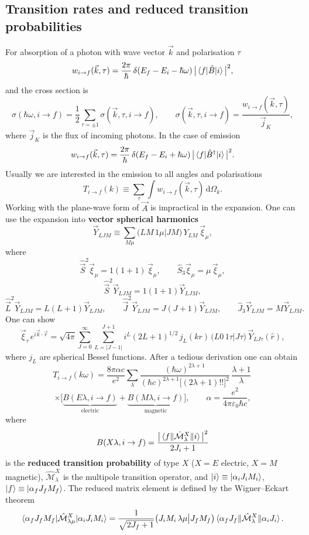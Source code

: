 \documentclass[11pt,a4paper]{article}
\newcommand{\op}[1]{\hat{#1}}
\newcommand{\ud}{\mathrm{d}}
\begin{document}
\subsection{Transition rates and reduced transition probabilities}
For absorption of a photon with wave vector $\vec k$ and polarisation $\tau$
\[
w_{i\to f}(\vec k,\tau)=\frac{2\pi}{\hbar}\,\delta(E_f-E_i-\hbar\omega)\,\big|\braket{f|\op B|i}\big|^2 ,
\]
and the cross section is
\[
\sigma(\hbar\omega,i\to f)=\frac12\sum_{\tau=\pm1}\sigma(\vec k,\tau,i\to f),
\qquad
\sigma(\vec k,\tau,i\to f)=\frac{w_{i\to f}(\vec k,\tau)}{\vec j_K},
\]
where $\vec j_K$ is the flux of incoming photons.
In the case of emission
\[
w_{i\to f}(\vec k,\tau)=\frac{2\pi}{\hbar}\,\delta(E_f-E_i+\hbar\omega)\,\big|\braket{f|\op B^\dagger|i}\big|^2 .
\]
Usually we are interested in the emission to all angles and polarisations
\[
T_{i\to f}(k)\equiv\sum_\tau\int w_{i\to f}(\vec k,\tau)\,\ud\Omega_k .
\]
Working with the plane-wave form of $\vec A$ is impractical in the expansion. One can use the expansion into \textbf{vector spherical harmonics}
\[
\vec Y_{LJM}\equiv\sum_{M\mu}\big(LM\,1\mu\big|JM\big)\,Y_{LM}\,\vec\xi_\mu ,
\]
where
\[
\op{\vec S}^2\vec\xi_\mu=1(1+1)\,\vec\xi_\mu,\qquad \op S_3\vec\xi_\mu=\mu\,\vec\xi_\mu,
\]
\[
\op{\vec S}^2\vec Y_{LJM}=1(1+1)\vec Y_{LJM},
\]
\[
\op{\vec L}^2\vec Y_{LJM}=L(L+1)\vec Y_{LJM},\qquad
\op{\vec J}^2\vec Y_{LJM}=J(J+1)\vec Y_{LJM},\qquad
\op J_3\vec Y_{LJM}=M\vec Y_{LJM}.
\]
One can show
\[
\vec\xi_\tau\,e^{i\vec k\cdot\vec r}=\sqrt{4\pi}\sum_{J=0}^\infty\sum_{L=|J-1|}^{J+1}i^L(2L+1)^{1/2}\,j_L(kr)\,\big(L0\,1\tau\big|J\tau\big)\,\vec Y_{LJ\tau}(\hat r),
\]
where $j_L$ are spherical Bessel functions. After a tedious derivation one can obtain
\[
T_{i\to f}(k\omega)=\frac{8\pi\alpha c}{e^2}\sum_\lambda\frac{(\hbar\omega)^{2\lambda+1}}{(\hbar c)^{2\lambda+1}\big[(2\lambda+1)!!\big]^2}\,\frac{\lambda+1}{\lambda}\,
\]
\[
\times\Big[\underbrace{B(E\lambda,i\to f)}_{\text{electric}}+\underbrace{B(M\lambda,i\to f)}_{\text{magnetic}}\Big],
\qquad \alpha=\frac{e^2}{4\pi\varepsilon_0\hbar c},
\]
where
\[
B(X\lambda,i\to f)=\frac{\big|\braket{f\|\op{\mathcal M}^X_\lambda\|i}\big|^2}{2J_i+1}
\]
is the \textbf{reduced transition probability} of type $X$ ($X=E$ electric, $X=M$ magnetic), $\op{\mathcal M}^X_\lambda$ is the multipole transition operator, and $\ket i\equiv\ket{\alpha_iJ_iM_i}$, $\ket f\equiv\ket{\alpha_fJ_fM_f}$. The reduced matrix element is defined by the Wigner--Eckart theorem
\[
\braket{\alpha_fJ_fM_f|\op{\mathcal M}^X_{\lambda\mu}|\alpha_iJ_iM_i}=\frac{1}{\sqrt{2J_f+1}}\big(J_iM_i\,\lambda\mu\big|J_fM_f\big)\braket{\alpha_fJ_f\|\op{\mathcal M}^X_\lambda\|\alpha_iJ_i}.
\]
\end{document}
